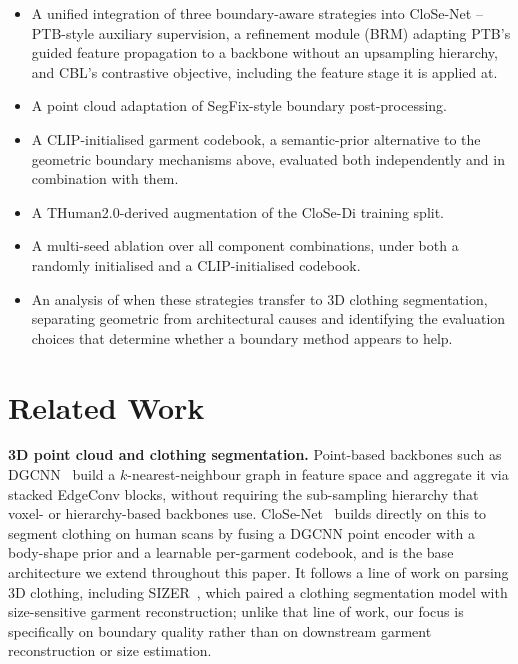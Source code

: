 \documentclass{article}
\theoremstyle{plain}
\theoremstyle{definition}
\theoremstyle{remark}
\begin{document}
\begin{itemize}
  \item A unified integration of three boundary-aware strategies into
        CloSe-Net -- PTB-style auxiliary supervision, a refinement module
        (BRM) adapting PTB's guided feature propagation to a backbone without
        an upsampling hierarchy, and CBL's contrastive objective, including
        the feature stage it is applied at.
  \item A point cloud adaptation of SegFix-style boundary post-processing.
  \item A CLIP-initialised garment codebook, a semantic-prior alternative to
        the geometric boundary mechanisms above, evaluated both independently
        and in combination with them.
  \item A THuman2.0-derived augmentation of the CloSe-Di training split.
  \item A multi-seed ablation over all component combinations, under both a
        randomly initialised and a CLIP-initialised codebook.
  \item An analysis of when these strategies transfer to 3D clothing
        segmentation, separating geometric from architectural causes and
        identifying the evaluation choices that determine whether a boundary
        method appears to help.
\end{itemize}

\section{Related Work}
\label{sec:related}

\textbf{3D point cloud and clothing segmentation.} Point-based backbones such
as DGCNN~\cite{wang2019dynamicgraphcnnlearning} build a $k$-nearest-neighbour
graph in feature space and aggregate it via stacked EdgeConv blocks, without
requiring the sub-sampling hierarchy that voxel- or hierarchy-based backbones
use. CloSe-Net~\cite{antic2024close} builds directly on this to segment
clothing on human scans by fusing a DGCNN point encoder with a body-shape
prior and a learnable per-garment codebook, and is the base architecture we
extend throughout this paper. It follows a line of work on parsing 3D
clothing, including SIZER~\cite{tiwari20sizer}, which paired a clothing
segmentation model with size-sensitive garment reconstruction; unlike that
line of work, our focus is specifically on boundary quality rather than on
downstream garment reconstruction or size estimation.
\end{document}
